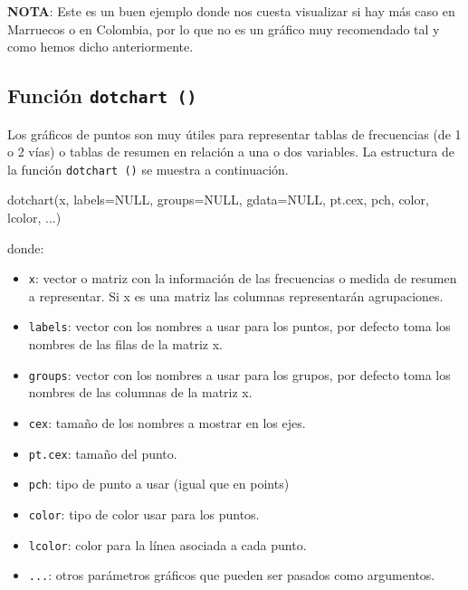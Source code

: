 \documentclass[
]{book}
\newenvironment{Shaded}{\begin{snugshade}}{\end{snugshade}}
\newcommand{\AttributeTok}[1]{\textcolor[rgb]{0.77,0.63,0.00}{#1}}
\newcommand{\ConstantTok}[1]{\textcolor[rgb]{0.00,0.00,0.00}{#1}}
\newcommand{\FunctionTok}[1]{\textcolor[rgb]{0.00,0.00,0.00}{#1}}
\newcommand{\NormalTok}[1]{#1}
\providecommand{\tightlist}{%
  \setlength{\itemsep}{0pt}\setlength{\parskip}{0pt}}
\begin{document}
\textbf{NOTA}: Este es un buen ejemplo donde nos cuesta visualizar si hay más caso en Marruecos o en Colombia, por lo que no es un gráfico muy recomendado tal y como hemos dicho anteriormente.

\hypertarget{funciuxf3n-dotchart}{%
\subsection{\texorpdfstring{Función \texttt{dotchart\ ()}}{Función dotchart ()}}\label{funciuxf3n-dotchart}}

Los gráficos de puntos son muy útiles para representar tablas de frecuencias (de 1 o 2 vías) o tablas de resumen en relación a una o dos variables. La estructura de la función \texttt{dotchart\ ()} se muestra a continuación.

\begin{Shaded}
\begin{Highlighting}[]
\FunctionTok{dotchart}\NormalTok{(x, }\AttributeTok{labels=}\ConstantTok{NULL}\NormalTok{, }\AttributeTok{groups=}\ConstantTok{NULL}\NormalTok{, }\AttributeTok{gdata=}\ConstantTok{NULL}\NormalTok{,}
\NormalTok{         pt.cex, pch, color, lcolor, ...)}
\end{Highlighting}
\end{Shaded}

donde:

\begin{itemize}
\tightlist
\item
  \texttt{x}: vector o matriz con la información de las frecuencias o medida de resumen a representar. Si x es una matriz las columnas representarán agrupaciones.
\item
  \texttt{labels}: vector con los nombres a usar para los puntos, por defecto toma los nombres de las filas de la matriz x.
\item
  \texttt{groups}: vector con los nombres a usar para los grupos, por defecto toma los nombres de las columnas de la matriz x.
\item
  \texttt{cex}: tamaño de los nombres a mostrar en los ejes.
\item
  \texttt{pt.cex}: tamaño del punto.
\item
  \texttt{pch}: tipo de punto a usar (igual que en points)
\item
  \texttt{color}: tipo de color usar para los puntos.
\item
  \texttt{lcolor}: color para la línea asociada a cada punto.
\item
  \texttt{...}: otros parámetros gráficos que pueden ser pasados como argumentos.
\end{itemize}
\end{document}
